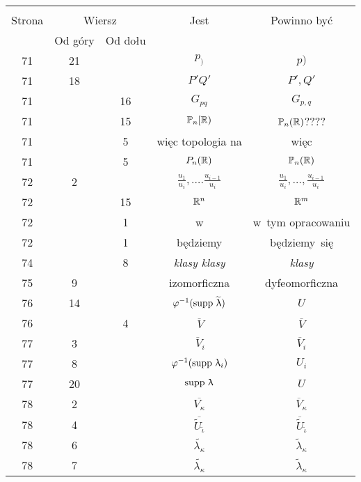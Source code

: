 \documentclass[a4paper,11pt]{article}
\begin{document}
\begin{center}
  \begin{tabular}{|c|c|c|c|c|}
    \hline
    & \multicolumn{2}{c|}{} & & \\
    Strona & \multicolumn{2}{c|}{Wiersz} & Jest
                              & Powinno być \\ \cline{2-3}
    & Od góry & Od dołu & & \\
    \hline
    71  & 21 & & $p_{ ) }$ & $p )$ \\
    71  & 18 & & $P' Q'$ & $P', Q'$ \\
    71  & & 16 & $G_{ pq }$ & $G_{ p, q }$ \\
    71  & & 15 & $\mathbb{P}_{ n }[ \mathbb{R} )$ & $\mathbb{P}_{ n }( \mathbb{R} )$???? \\
    71  & &  5 & więc topologia na & więc \\
    71  & &  5 & $P_{ n }( \mathbb{R} )$ & $\mathbb{P}_{ n }( \mathbb{R} )$ \\
    72  &  2 & & $\frac{ u_{ 1 } }{ u_{ i } }, \ldots.
                 \frac{ u_{ i - 1 } }{ u_{ i } }$
           & $\frac{ u_{ 1 } }{ u_{ i } }, \ldots,
             \frac{ u_{ i - 1 } }{ u_{ i } }$ \\[0.3em]
    72  & & 15 & $\mathbb{R}^{ n }$ & $\mathbb{R}^{ m }$ \\
    72  & &  1 & w & w~tym opracowaniu \\
    72  & &  1 & będziemy & będziemy~się \\
    74  & &  8 & \textit{klasy klasy} & \textit{klasy} \\
    75  &  9 & & izomorficzna & dyfeomorficzna \\
    76  & 14 & & $\varphi^{ -1 }( \mathrm{supp}\, \, \widetilde{ \uplambda } )$ & $U$ \\
    76  & &  4 & $\overline{ \, V }$ & $\overline{ V }$ \\
    77  &  3 & & $\overline{ \, V }_{ i }$ & $\overline{ V }_{ i }$ \\
    77  &  8 & & $\varphi^{ -1 }( \mathrm{supp}\, \, \uplambda_{ i } )$ & $U_{ i }$ \\
    77  & 20 & & $\mathrm{supp}\, \, \uplambda$ & $U$ \\
    78  &  2 & & $\overline{ V_{ \kappa } }$ & $\overline{ V }_{ \kappa }$ \\[0.3em]
    78  &  4 & & $\overline{ \widetilde{ U }_{ \tilde{ \iota } } }$
           & $\overline{ \widetilde{ U } }_{ \tilde{ \iota } }$ \\
    78  &  6 & & $\widetilde{ \lambda_{ \kappa } }$ & $\widetilde{ \lambda }_{ \kappa }$ \\
    78  &  7 & & $\widetilde{ \lambda_{ \kappa } }$ & $\widetilde{ \lambda }_{ \kappa }$ \\

\end{tabular}
\end{center}
\end{document}
